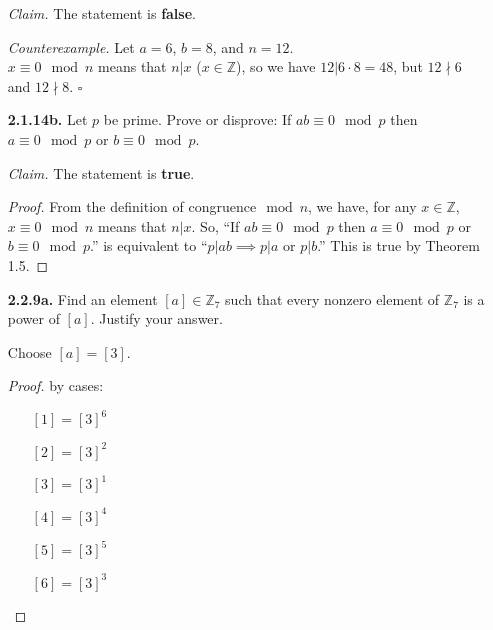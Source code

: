 \documentclass[12pt]{article}
\newcommand{\zee}{\mathbb{Z}}
\begin{document}
\begin{itemize}
\textit{Claim.} The statement is \textbf{false}.
\par
\textit{Counterexample.}  Let $a=6$, $b=8$, and $n=12$.\\
$x\equiv0\mod n$ means that $n|x$ ($x \in \zee$), so we have
$12|6 \cdot 8 = 48$, but $12 \nmid 6$ and $12 \nmid 8$.
$\square$


\item[\textbf{2.1.14b.}] Let $p$ be prime. Prove or disprove:  If $ab\equiv0\mod p$ then $a\equiv0\mod p$ or $b\equiv0\mod p$.

\textit{Claim.} The statement is \textbf{true}.
\begin{proof}
  From the definition of congruence$\mod n$, we have, for any $x\in\zee$, $x\equiv0\mod n$ means that $n|x$.
  So, ``If $ab\equiv0\mod p$ then $a\equiv0\mod p$ or $b\equiv0\mod p$.'' is equivalent to ``$p|ab \implies p|a \text{ or } p|b$.''
  This is true by Theorem 1.5.
\end{proof}


\item[\textbf{2.2.9a.}] Find an element $[a]\in\zee_7$ such that every nonzero element of $\zee_7$ is a power of $[a]$. Justify your answer.

Choose $[a] = [3]$.
\begin{proof}
by cases:
\begin{itemize}
\item[] $[1] = {[3]}^6$
\item[] $[2] = {[3]}^2$
\item[] $[3] = {[3]}^1$
\item[] $[4] = {[3]}^4$
\item[] $[5] = {[3]}^5$
\item[] $[6] = {[3]}^3$
\end{itemize}
\end{proof}

\end{itemize}
\end{document}
